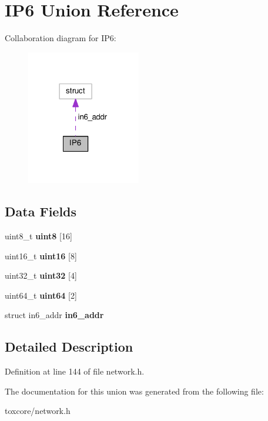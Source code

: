 \hypertarget{union_i_p6}{\section{I\+P6 Union Reference}
\label{union_i_p6}
}


Collaboration diagram for I\+P6\+:\nopagebreak
\begin{figure}[H]
\begin{center}
\leavevmode
\includegraphics[width=141pt]{union_i_p6__coll__graph}
\end{center}
\end{figure}
\subsection*{Data Fields}
\begin{DoxyCompactItemize}
\item 
\hypertarget{union_i_p6_a6b067d428eefbf1754aa09429b1ba524}{uint8\+\_\+t {\bfseries uint8} \mbox{[}16\mbox{]}}\label{union_i_p6_a6b067d428eefbf1754aa09429b1ba524}

\item 
\hypertarget{union_i_p6_af0f89d2fc8c3ccbcc4fca0156563fcfe}{uint16\+\_\+t {\bfseries uint16} \mbox{[}8\mbox{]}}\label{union_i_p6_af0f89d2fc8c3ccbcc4fca0156563fcfe}

\item 
\hypertarget{union_i_p6_a1d8ab1f6c1da5565bed41e7095610dea}{uint32\+\_\+t {\bfseries uint32} \mbox{[}4\mbox{]}}\label{union_i_p6_a1d8ab1f6c1da5565bed41e7095610dea}

\item 
\hypertarget{union_i_p6_a36c7a85cc2c5062edd5ebf13d46fa343}{uint64\+\_\+t {\bfseries uint64} \mbox{[}2\mbox{]}}\label{union_i_p6_a36c7a85cc2c5062edd5ebf13d46fa343}

\item 
\hypertarget{union_i_p6_ac312c20ade57f180c50585e9ea42314c}{struct in6\+\_\+addr {\bfseries in6\+\_\+addr}}\label{union_i_p6_ac312c20ade57f180c50585e9ea42314c}

\end{DoxyCompactItemize}


\subsection{Detailed Description}


Definition at line 144 of file network.\+h.



The documentation for this union was generated from the following file\+:\begin{DoxyCompactItemize}
\item 
toxcore/network.\+h\end{DoxyCompactItemize}
